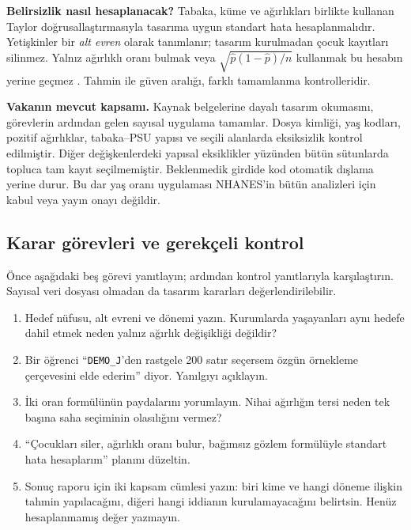 \textbf{Belirsizlik nasıl hesaplanacak?} Tabaka, küme ve ağırlıkları
birlikte kullanan Taylor doğrusallaştırmasıyla tasarıma uygun standart
hata hesaplanmalıdır. Yetişkinler bir \emph{alt evren} olarak tanımlanır;
tasarım kurulmadan çocuk kayıtları silinmez. Yalnız ağırlıklı oranı
bulmak veya $\sqrt{\widehat p(1-\widehat p)/n}$ kullanmak bu hesabın
yerine geçmez \citep{nchsvariance}. Tahmin ile güven aralığı, farklı
tamamlanma kontrolleridir.

\begin{researchbox}
\textbf{Vakanın mevcut kapsamı.} Kaynak belgelerine dayalı tasarım
okumasını, görevlerin ardından gelen sayısal uygulama tamamlar.
Dosya kimliği, yaş kodları, pozitif ağırlıklar, tabaka--PSU yapısı ve
seçili alanlarda eksiksizlik kontrol edilmiştir. Diğer değişkenlerdeki
yapısal eksiklikler yüzünden bütün sütunlarda topluca tam kayıt
seçilmemiştir. Beklenmedik girdide kod otomatik dışlama yerine durur.
Bu dar yaş oranı uygulaması NHANES'in bütün analizleri için kabul
veya yayın onayı değildir.
\end{researchbox}

\subsection{Karar görevleri ve gerekçeli kontrol}
Önce aşağıdaki beş görevi yanıtlayın; ardından kontrol yanıtlarıyla
karşılaştırın. Sayısal veri dosyası olmadan da tasarım kararları
değerlendirilebilir.

\begin{enumerate}
\item Hedef nüfusu, alt evreni ve dönemi yazın. Kurumlarda yaşayanları
aynı hedefe dahil etmek neden yalnız ağırlık değişikliği değildir?
\item Bir öğrenci ``\texttt{DEMO\_J}'den rastgele 200 satır seçersem
özgün örnekleme çerçevesini elde ederim'' diyor. Yanılgıyı açıklayın.
\item İki oran formülünün paydalarını yorumlayın. Nihai ağırlığın tersi
neden tek başına saha seçiminin olasılığını vermez?
\item ``Çocukları siler, ağırlıklı oranı bulur, bağımsız gözlem
formülüyle standart hata hesaplarım'' planını düzeltin.
\item Sonuç raporu için iki kapsam cümlesi yazın: biri kime ve hangi
döneme ilişkin tahmin yapılacağını, diğeri hangi iddianın
kurulamayacağını belirtsin. Henüz hesaplanmamış değer yazmayın.
\end{enumerate}

